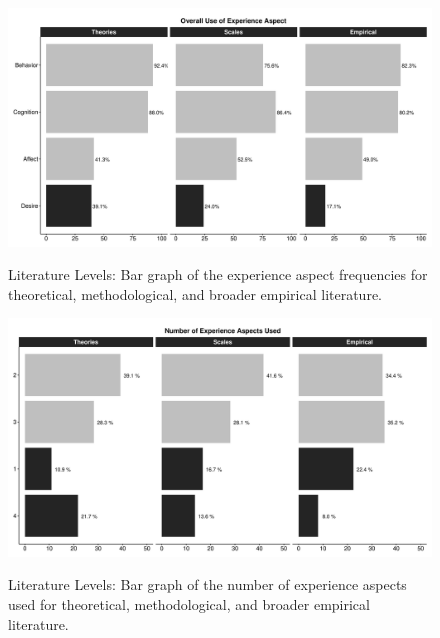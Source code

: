 \begin{figure}[h]
\centering
\caption{Literature Levels: Bar graph of the experience aspect frequencies for theoretical, methodological, and broader empirical literature.}
\includegraphics[width=\textwidth]{Figures/CombinedABCDBar-1}
\label{fig:CombinedAspects}
\end{figure}

\begin{figure}[h]
\centering
\caption{Literature Levels: Bar graph of the number of experience aspects used for theoretical, methodological, and broader empirical literature.}
\includegraphics[width=\textwidth]{Figures/CombinedComplexityBar-1}
\label{fig:CombinedComplexity}
\end{figure}

